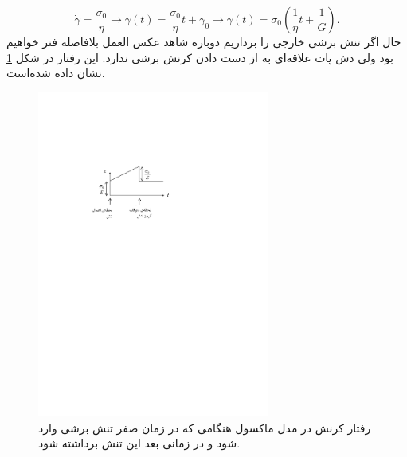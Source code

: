 \begin{equation}
\dot\gamma=\frac{\sigma_0}{\eta}\rightarrow \gamma(t)=\frac{\sigma_0}{\eta}t+\gamma_0\rightarrow \gamma(t)=\sigma_0\left(\frac{1}{\eta}t+\frac{1}{G}\right).
\end{equation}
حال اگر تنش برشی خارجی را برداریم دوباره شاهد عکس العمل بلافاصله فنر خواهیم بود ولی دش پات علاقه‌ای به از دست دادن کرنش برشی ندارد. این رفتار در شکل \ref{fig:creep_maxwell} نشان داده شده‌است.

\begin{figure}[htbp]
\begin{center}
\includegraphics[width=3in]{Figs/creep_maxwell}
\caption{
رفتار کرنش در مدل ماکسول هنگامی که در زمان صفر تنش برشی وارد شود و در زمانی بعد این تنش برداشته شود.
}
\label{fig:creep_maxwell}
\end{center}
\end{figure}

